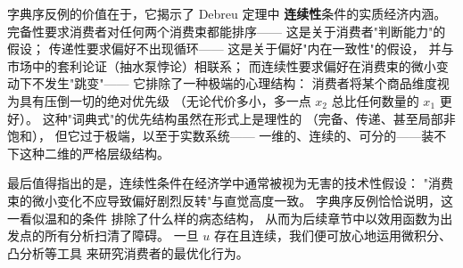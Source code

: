 字典序反例的价值在于，它揭示了 Debreu 定理中
\textbf{连续性}条件的实质经济内涵。
完备性要求消费者对任何两个消费束都能排序——
这是关于消费者"判断能力"的假设；
传递性要求偏好不出现循环——
这是关于偏好"内在一致性"的假设，
并与市场中的套利论证（抽水泵悖论）相联系；
而连续性要求偏好在消费束的微小变动下不发生"跳变"——
它排除了一种极端的心理结构：
消费者将某个商品维度视为具有压倒一切的绝对优先级
（无论代价多小，多一点 $x_2$ 总比任何数量的 $x_1$ 更好）。
这种"词典式"的优先结构虽然在形式上是理性的
（完备、传递、甚至局部非饱和），
但它过于极端，以至于实数系统——
一维的、连续的、可分的——装不下这种二维的严格层级结构。

最后值得指出的是，连续性条件在经济学中通常被视为无害的技术性假设：
"消费束的微小变化不应导致偏好剧烈反转"与直觉高度一致。
字典序反例恰恰说明，这一看似温和的条件
排除了什么样的病态结构，
从而为后续章节中以效用函数为出发点的所有分析扫清了障碍。
一旦 $u$ 存在且连续，我们便可放心地运用微积分、凸分析等工具
来研究消费者的最优化行为。
